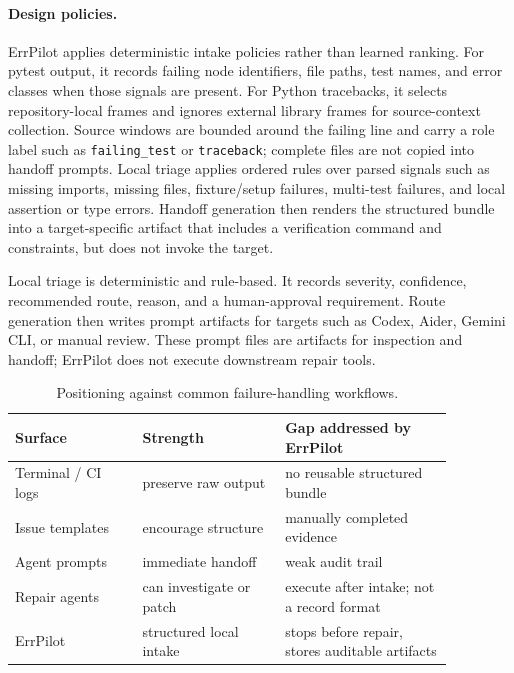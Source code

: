 \documentclass[sigconf]{acmart}
\begin{document}
\paragraph{Design policies.}
ErrPilot applies deterministic intake policies rather than learned ranking. For
pytest output, it records failing node identifiers, file paths, test names, and
error classes when those signals are present. For Python tracebacks, it selects
repository-local frames and ignores external library frames for source-context
collection. Source windows are bounded around the failing line and carry a role
label such as \texttt{failing\_test} or \texttt{traceback}; complete files are
not copied into handoff prompts. Local triage applies ordered rules over parsed
signals such as missing imports, missing files, fixture/setup failures,
multi-test failures, and local assertion or type errors. Handoff generation then
renders the structured bundle into a target-specific artifact that includes a
verification command and constraints, but does not invoke the target.

Local triage is deterministic and rule-based. It records severity, confidence,
recommended route, reason, and a human-approval requirement. Route generation
then writes prompt artifacts for targets such as Codex, Aider, Gemini CLI, or
manual review. These prompt files are artifacts for inspection and handoff;
ErrPilot does not execute downstream repair tools.

\begin{table}[t]
  \caption{Positioning against common failure-handling workflows.}
  \label{tab:positioning}
  \small
  \begin{tabular}{p{0.25\linewidth}p{0.29\linewidth}p{0.33\linewidth}}
    \toprule
    Surface & Strength & Gap addressed by ErrPilot \\
    \midrule
    Terminal / CI logs & preserve raw output & no reusable structured bundle \\
    Issue templates & encourage structure & manually completed evidence \\
    Agent prompts & immediate handoff & weak audit trail \\
    Repair agents & can investigate or patch & execute after intake; not a record format \\
    ErrPilot & structured local intake & stops before repair, stores auditable artifacts \\
    \bottomrule
  \end{tabular}
\end{table}
\end{document}
